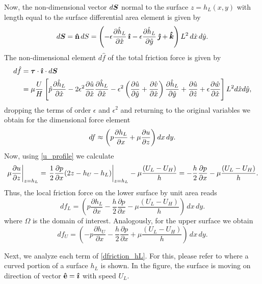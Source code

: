 Now, the non-dimensional vector $d\boldsymbol{S}$ normal to the surface $z=h_L(x,y)$ with length equal to the surface differential area element is given by
\begin{equation}
d\bds{S}=\mathbf{\hat{n}}\,dS=\left(-\epsilon\frac{\partial \hat{h}_L}{\partial \hat{x}}\,\bds{\hat{\imath}}-\epsilon\frac{\partial \hat{h}_L}{\partial \hat{y}}\,\bds{\hat{\jmath}}+\bds{\hat{k}}\right)
L^2\,d\hat{x}\,d\hat{y}.\label{eq:dS_friction}
\end{equation}
The non-dimensional element $d\hat{f}$ of the total friction force is given by
\begin{align*}
d\hat{f}&=\boldsymbol{\tau}\cdot \boldsymbol{\hat{\imath}}\cdot d\boldsymbol{S}\\
&=\mu \frac{U}{H} \left[ \hat{p}\frac{\partial \hat{h}_L}{\partial \hat{x}}-2\epsilon^2\frac{\partial \hat{u}}{\partial \hat{x}}\frac{\partial \hat{h}_L}{\partial \hat{x}}-\epsilon^2\left(\frac{\partial \hat{u}}{\partial \hat{y}}+\frac{\partial \hat{v}}{\partial \hat{x}}\right)\frac{\partial \hat{h}_L}{\partial \hat{y}}+\frac{\partial \hat{u}}{\partial \hat{z}}+\epsilon\frac{\partial \hat{w}}{\partial \hat{x}}\right]L^2d\hat{x}d\hat{y},
\end{align*}
dropping the terms of order $\epsilon$ and $\epsilon^2$ and returning to the original variables we obtain for the dimensional force element
\begin{equation}
df\approx \left(p \parder{h_L}{x}+\mu \parder{u}{z}\right)dx\,dy.\label{eq:df}
\end{equation}
Now, using \eqref{u_profile} we calculate
\begin{equation}
\left.\mu\parder{u}{z}\right|_{z=h_L}=\left.\frac{1}{2}\frac{\partial p}{\partial x} (2z-h_U-h_L)\right|_{z=h_L}-\mu\frac{(U_L-U_H)}{h}=-\frac{h}{2}\frac{\partial p}{\partial x}-\mu\frac{(U_L-U_H)}{h}.\label{eq:tau_xz}
\end{equation}
Thus, the local friction force on the lower surface by unit area reads
\begin{equation}
df_L= \left(p\frac{\partial h_L}{\partial x}-\frac{h}{2}\frac{\partial p}{\partial x}-\mu\frac{(U_L-U_H)}{h}\right)\,dx\,dy.\label{eq:dfriction_hL}
\end{equation}
where $\Omega$ is the domain of interest. Analogously, for the upper surface we obtain
\begin{equation}
df_U=\left(- p\frac{\partial h_U}{\partial x}-\frac{h}{2}\frac{\partial p}{\partial x}+\mu\frac{(U_L-U_H)}{h}\right)\,dx\,dy.\label{eq:dfriction_hU}
\end{equation}

 Next, we analyze each term of \eqref{dfriction_hL}. For this, please refer to  where a curved portion of a surface $h_L$ is shown. In the figure, the surface is moving on direction of vector $\mathbf{\hat{e}}=\boldsymbol{\hat{\imath}}$ with speed $U_L$.

